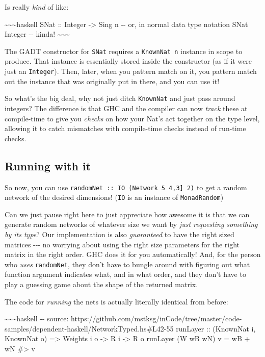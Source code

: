 \documentclass[]{article}
\begin{document}
Is really \emph{kind} of like:

\textasciitilde{}\textasciitilde{}\textasciitilde{}haskell SNat :: Integer
-\textgreater{} Sing n -\/- or, in normal data type notation SNat Integer -\/-
kinda! \textasciitilde{}\textasciitilde{}\textasciitilde{}

The GADT constructor for \texttt{SNat} requires a \texttt{KnownNat\ n} instance
in scope to produce. That instance is essentially stored inside the constructor
(as if it were just an \texttt{Integer}). Then, later, when you pattern match on
it, you pattern match out the instance that was originally put in there, and you
can use it!

So what's the big deal, why not just ditch \texttt{KnownNat} and just pass
around integers? The difference is that GHC and the compiler can now
\emph{track} these at compile-time to give you \emph{checks} on how your Nat's
act together on the type level, allowing it to catch mismatches with
compile-time checks instead of run-time checks.

\subsection{Running with it}

So now, you can use
\texttt{randomNet\ ::\ IO\ (Network\ 5\ \textquotesingle{}{[}4,3{]}\ 2)} to get
a random network of the desired dimensions! (\texttt{IO} is an instance of
\texttt{MonadRandom})

Can we just pause right here to just appreciate how awesome it is that we can
generate random networks of whatever size we want by \emph{just requesting
something by its type}? Our implementation is also \emph{guaranteed} to have the
right sized matrices -\/-\/- no worrying about using the right size parameters
for the right matrix in the right order. GHC does it for you automatically! And,
for the person who \emph{uses} \texttt{randomNet}, they don't have to bungle
around with figuring out what function argument indicates what, and in what
order, and they don't have to play a guessing game about the shape of the
returned matrix.

The code for \emph{running} the nets is actually literally identical from
before:

\textasciitilde{}\textasciitilde{}\textasciitilde{}haskell -\/- source:
https://github.com/mstksg/inCode/tree/master/code-samples/dependent-haskell/NetworkTyped.hs\#L42-55
runLayer :: (KnownNat i, KnownNat o) =\textgreater{} Weights i o -\textgreater{}
R i -\textgreater{} R o runLayer (W wB wN) v = wB + wN \#\textgreater{} v
\end{document}
